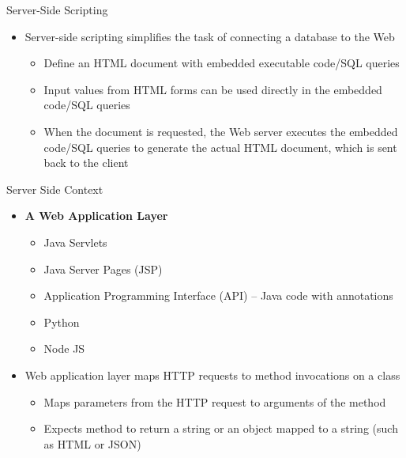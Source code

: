 \documentclass[aspectratio=169, xcolor=dvipsnames]{beamer}
\begin{document}
\begin{frame}{Server-Side Scripting}
    \begin{itemize}[<+->]
        \item Server-side scripting simplifies the task of connecting a database to the Web
        \begin{itemize}
            \item[$\triangleright$] Define an HTML document with embedded executable code/SQL queries
            \item[$\triangleright$] Input values from HTML forms can be used directly in the embedded code/SQL queries
            \item[$\triangleright$] When the document is requested, the Web server executes the embedded code/SQL queries to generate the actual HTML document, which is sent back to the client
        \end{itemize}
    \end{itemize}
\end{frame}

\begin{frame}{Server Side Context}
    \begin{itemize}[<+->]
        \item \textbf{A Web Application Layer}
        \begin{itemize}
            \item[$\triangleright$] Java Servlets
            \item[$\triangleright$] Java Server Pages (JSP)
            \item[$\triangleright$] Application Programming Interface (API) -- Java code with annotations
            \item[$\triangleright$] Python
            \item[$\triangleright$] Node JS
        \end{itemize}
        \item Web application layer maps HTTP requests to method invocations on a class
        \begin{itemize}
            \item[$\triangleright$] Maps parameters from the HTTP request to arguments of the method
            \item[$\triangleright$] Expects method to return a string or an object mapped to a string (such as HTML or JSON)
        \end{itemize}
    \end{itemize}
\end{frame}
\end{document}
